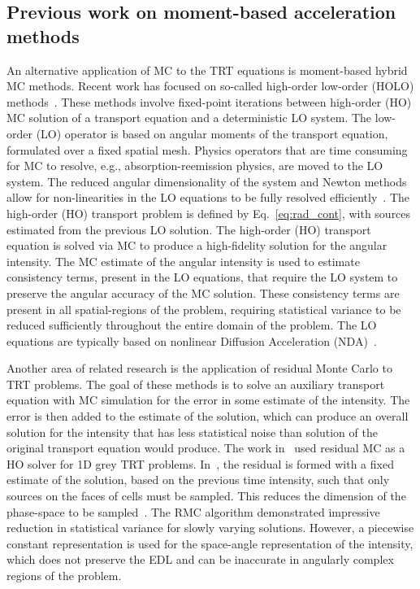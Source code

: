 \subsection{Previous work on moment-based acceleration methods}

An alternative application of MC to the TRT equations is moment-based hybrid MC methods.
Recent work has focused on so-called high-order low-order (HOLO)
methods~\cite{willert,park,rmc,ans_2014,bolding_nse}. These methods involve fixed-point
iterations between high-order (HO) MC solution of a transport equation and a deterministic LO
system.  The low-order (LO)
operator is based on angular moments of the transport equation, formulated over a fixed
spatial mesh.  Physics operators that are time consuming for MC
to resolve, e.g., absorption-reemission physics, are moved to the LO
system.  The reduced angular dimensionality of the system and Newton methods allow for non-linearities in the LO equations to be fully
resolved efficiently~\cite{willert,park}.  The high-order (HO) transport problem is defined by 
Eq.~\eqref{eq:rad_cont}, with sources estimated from the previous LO solution.  
The high-order (HO) transport equation is solved via MC to produce a high-fidelity solution for
the angular intensity.  The MC estimate of the angular intensity is used to estimate
consistency terms,
present in the LO equations, that require the LO system to preserve the angular accuracy of the
MC solution.   
These consistency terms are present in all spatial-regions of the problem, requiring
statistical variance to be reduced sufficiently throughout the entire domain of the
problem.   The LO equations are typically based on nonlinear Diffusion Acceleration
(NDA)~\cite{willert,park}.

Another area of related research is the application of
residual Monte Carlo to TRT problems.  The goal of these methods is to solve an auxiliary transport
equation with MC simulation for the error in some estimate of the intensity.  The error is then added to the
estimate of the solution, which can produce an overall solution for the intensity that has
less statistical noise than solution of the original transport equation would produce.
The work in~\cite{rmc} used residual MC as a HO solver for 1D grey TRT problems.
In~\cite{rmc}, the residual is formed with a fixed estimate of the solution, based
on the previous time intensity, such that only
sources on the faces of cells must be sampled. This reduces the dimension of the
phase-space to be sampled~\cite{rmc}. The RMC algorithm demonstrated impressive reduction
in statistical variance for slowly varying solutions.  However, a
piecewise constant representation is used for the space-angle representation of the
intensity, which does not preserve the EDL and can be inaccurate in angularly complex
regions of the problem.  

